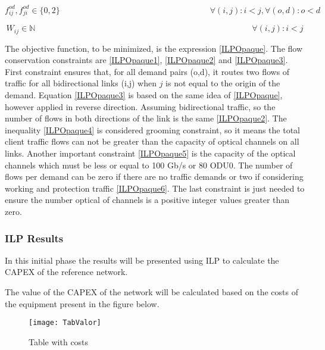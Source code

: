 \vspace{-5pt}
\begin{equation}
f_{ij}^{od} , f_{ji}^{od} \in \{0,2\}   \qquad \qquad \qquad \qquad \qquad \qquad \qquad \qquad \qquad
\forall(i,j) : i < j, \forall(o,d) : o < d
\label{ILPOpaque6}
\end{equation}

\vspace{-5pt}
\begin{equation}
W_{ij} \in \mathbb{N}  \qquad \qquad \qquad \qquad \qquad \qquad \qquad \qquad \qquad \qquad \qquad \qquad \qquad
\forall(i,j) : i < j\label{ILPOpaque7}
\end{equation}


The objective function, to be minimized, is the expression \ref{ILPOpaque}. The flow conservation constraints are \ref{ILPOpaque1}, \ref{ILPOpaque2} and \ref{ILPOpaque3}. First constraint ensures that, for all demand pairs (o,d), it routes two flows of traffic for all bidirectional links (i,j) when $j$ is not equal to the origin of the demand. Equation \ref{ILPOpaque3} is based on the same idea of \ref{ILPOpaque}, however applied in reverse direction. Assuming bidirectional traffic, so the number of flows in both directions of the link is the same \ref{ILPOpaque2}. The inequality \ref{ILPOpaque4} is considered grooming constraint, so it means the total client traffic flows can not be greater than the capacity of optical channels on all links. Another important constraint \ref{ILPOpaque5} is the capacity of the optical channels which must be less or equal to 100 Gb/s or 80 ODU0. The number of flows per demand can be zero if there are no traffic demands or two if considering working and protection traffic \ref{ILPOpaque6}. The last constraint is just needed to ensure the number optical of channels is a positive integer values greater than zero.


\subsubsection{ILP Results}

In this initial phase the results will be presented using ILP to calculate the CAPEX of the reference network.

The value of the CAPEX of the network will be calculated based on the costs of the equipment present in the figure below.
\begin{figure}[h!]
  \centering
  \texttt{[image: TabValor]}
  \caption{Table with costs}
  \label{TabCustOp}
\end{figure}

